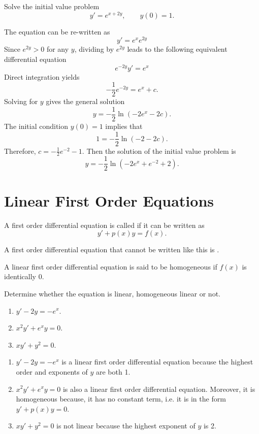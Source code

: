 \begin{example}
  Solve the initial value problem
	\[y'= e^{x+2y},\qquad y(0)=1.\]
\end{example}
\begin{solution}
  The equation can be re-written as
\[y'= e^x e^{2y}\]
Since $e^{2y}>0$ for any $y$, dividing by $e^{2y}$ leads to the following equivalent differential equation
\[e^{-2y}y' = e^x\]
Direct integration yields
\[-\frac{1}{2} e^{-2y} = e^x + c.\]
Solving for $y$ gives the general solution
\[y = -\frac{1}{2} \ln{(-2 e^x -2c)}.\]
The initial condition $y(0)=1$ implies that
\[1 = -\frac{1}{2} \ln{(-2 -2c)}.\]
Therefore, $c=-\frac{1}{2}e^{-2}-1$.
Then the solution of the initial value problem is
\[y = -\frac{1}{2} \ln{(-2 e^x + e^{-2}+ 2)}.\]
\end{solution}

\section{Linear First Order Equations}
\begin{definition}
  A first order differential equation is called  if it can be written as
  $$y' + p(x)y = f(x).$$

  A first order differential equation that cannot be written like this is .

  A linear first order differential equation is said to be homogeneous if $f(x)$ is identically $0$.
\end{definition}

\begin{example}
  Determine whether the equation is linear, homogeneous linear or not.
  \begin{enumerate}
    \item  $y' - 2y = - e^{x}$.
    \item  $x^2y'+ e^xy=0$.
    \item $xy'+ y^2=0$.
  \end{enumerate}
\end{example}
\begin{solution}
  \begin{enumerate}
    \item  $y' - 2y = - e^{x}$ is a linear first order differential equation because the highest order and exponents of $y$ are both 1. 
    \item  $x^2y'+ e^xy=0$ is also a linear first order differential equation. Moreover, it is homogeneous because, it has no constant term, i.e. it is in the form $y'+p(x)y=0$.
    \item $xy'+ y^2=0$ is not linear because the highest exponent of $y$ is 2.
  \end{enumerate}
\end{solution}

